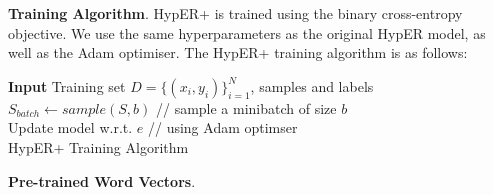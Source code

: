 \textbf{Training Algorithm}. HypER+ is trained using the binary cross-entropy objective. We use the same hyperparameters as the original HypER model, as well as the Adam optimiser. The HypER+ training algorithm is as follows: \newline

\begin{algorithm}[H]
	\SetAlgoLined
	\textbf{Input} 
	Training set \begin{math} D = \{(x_i, y_i)\}_{i=1}^N \end{math}, samples and labels\;
  	\begin{math} S_{batch} \gets sample(S, b) \end{math} // sample a minibatch of size \begin{math} b \end{math} \\
	Update model w.r.t. \begin{math}  e \end{math} // using Adam optimser \\
	\caption{HypER+ Training Algorithm}
\end{algorithm} \bigbreak

\textbf{Pre-trained Word Vectors}.  
